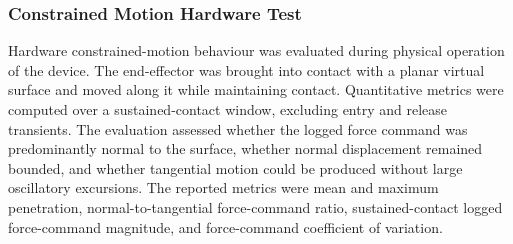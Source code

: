 \subsubsection{Constrained Motion Hardware Test} \label{sec:method_constrained_motion_hardware}

Hardware constrained-motion behaviour was evaluated during physical operation of the device.
The end-effector was brought into contact with a planar virtual surface and moved along it while maintaining contact. Quantitative metrics were computed over a sustained-contact window, excluding entry and release transients. The evaluation assessed whether the logged force command was predominantly normal to the surface, whether normal displacement remained bounded, and whether tangential motion could be produced without large oscillatory excursions. The reported metrics were mean and maximum penetration, normal-to-tangential force-command ratio, sustained-contact logged force-command magnitude, and force-command coefficient of variation.
